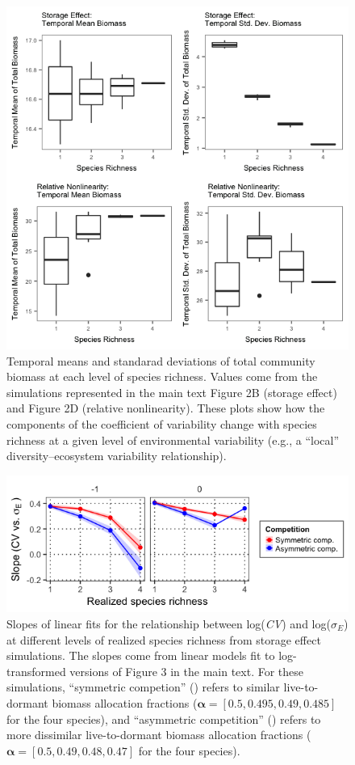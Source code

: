 \documentclass[11pt,]{article}
\begin{document}
\begin{figure}[!ht]
  \centering
      \includegraphics[width=5in]{./components/SI_temp_means_sds_local.png}
  \caption{Temporal means and standarad deviations of total community biomass at each level of species richness. Values come from the simulations represented in the main text Figure 2B (storage effect) and Figure 2D (relative nonlinearity). These plots show how the components of the coefficient of variability change with species richness at a given level of environmental variability (e.g., a ``local'' diversity--ecosystem variability relationship).}
\end{figure}

\newpage{}

\begin{figure}[!ht]
  \centering
      \includegraphics[width=5in]{./components/storage_effect_div+envar_varycomp_loglog_slopes.png}
  \caption{Slopes of linear fits for the relationship between log(\emph{CV}) and log($\sigma_E$) at different levels of realized species richness from storage effect simulations. The slopes come from linear models fit to log-transformed versions of Figure 3 in the main text. For these simulations, ``symmetric competion'' (\tikzcircle{1.5pt}) refers to similar live-to-dormant biomass allocation fractions ($\boldsymbol{\alpha} = [0.5, 0.495, 0.49, 0.485]$ for the four species), and ``asymmetric competition'' (\tikzcircle[fill=blue]{1.5pt}) refers to more dissimilar live-to-dormant biomass allocation fractions ($\boldsymbol{\alpha} = [0.5, 0.49, 0.48, 0.47]$ for the four species).}
\end{figure}
\end{document}
